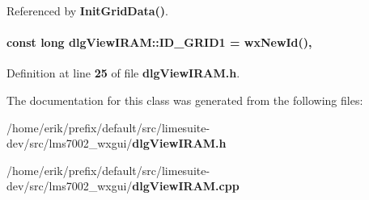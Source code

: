 Referenced by {\bf Init\+Grid\+Data()}.

\paragraph[{I\+D\+\_\+\+G\+R\+I\+D1}]{\setlength{\rightskip}{0pt plus 5cm}const long dlg\+View\+I\+R\+A\+M\+::\+I\+D\+\_\+\+G\+R\+I\+D1 = wx\+New\+Id()\hspace{0.3cm}{\ttfamily [static]}, {\ttfamily [protected]}}\label{classdlgViewIRAM_a393f1c171d0e6aeec1ce833e9eabf0db}


Definition at line {\bf 25} of file {\bf dlg\+View\+I\+R\+A\+M.\+h}.



The documentation for this class was generated from the following files\+:\begin{DoxyCompactItemize}
\item 
/home/erik/prefix/default/src/limesuite-\/dev/src/lms7002\+\_\+wxgui/{\bf dlg\+View\+I\+R\+A\+M.\+h}\item 
/home/erik/prefix/default/src/limesuite-\/dev/src/lms7002\+\_\+wxgui/{\bf dlg\+View\+I\+R\+A\+M.\+cpp}\end{DoxyCompactItemize}
